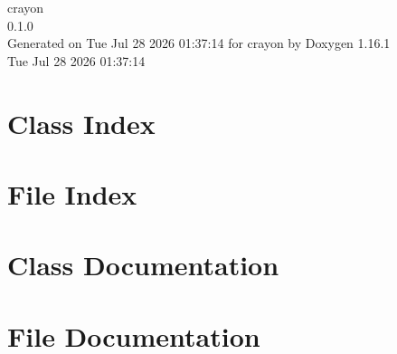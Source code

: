 \documentclass[twoside]{book}
\newcommand{\+}{\discretionary{\mbox{\scriptsize$\hookleftarrow$}}{}{}}
\newcommand{\clearemptydoublepage}{%
    \newpage{\pagestyle{empty}\cleardoublepage}%
  }
\begin{document}
  \raggedbottom
    \hypersetup{pageanchor=false,
                bookmarksnumbered=true,
                pdfencoding=unicode
               }
  \begin{titlepage}
  \vspace*{7cm}
  \begin{center}%
  {\Large crayon}\\
  [1ex]\large 0.\+1.\+0 \\
  \vspace*{1cm}
  {\large Generated on Tue Jul 28 2026 01:\+37:\+14 for crayon by Doxygen 1.16.1}\\
    \vspace*{0.5cm}
    {\small Tue Jul 28 2026 01:37:14}
  \end{center}
  \end{titlepage}
  \clearemptydoublepage
  \tableofcontents
  \clearemptydoublepage
  \hypersetup{pageanchor=true}

\chapter{Class Index}

\chapter{File Index}

\chapter{Class Documentation}

\chapter{File Documentation}



  \backmatter
  \newpage
  \clearemptydoublepage
  \printindex
\end{document}
